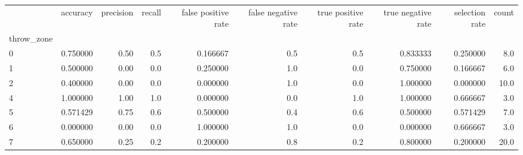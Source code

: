 \begin{tabular}{lrrrrrrrrr}
\toprule
{} &  accuracy &  precision &  recall &  false positive rate &  false negative rate &  true positive rate &  true negative rate &  selection rate &  count \\
throw\_zone &           &            &         &                      &                      &                     &                     &                 &        \\
\midrule
0          &  0.750000 &       0.50 &     0.5 &             0.166667 &                  0.5 &                 0.5 &            0.833333 &        0.250000 &    8.0 \\
1          &  0.500000 &       0.00 &     0.0 &             0.250000 &                  1.0 &                 0.0 &            0.750000 &        0.166667 &    6.0 \\
2          &  0.400000 &       0.00 &     0.0 &             0.000000 &                  1.0 &                 0.0 &            1.000000 &        0.000000 &   10.0 \\
4          &  1.000000 &       1.00 &     1.0 &             0.000000 &                  0.0 &                 1.0 &            1.000000 &        0.666667 &    3.0 \\
5          &  0.571429 &       0.75 &     0.6 &             0.500000 &                  0.4 &                 0.6 &            0.500000 &        0.571429 &    7.0 \\
6          &  0.000000 &       0.00 &     0.0 &             1.000000 &                  1.0 &                 0.0 &            0.000000 &        0.666667 &    3.0 \\
7          &  0.650000 &       0.25 &     0.2 &             0.200000 &                  0.8 &                 0.2 &            0.800000 &        0.200000 &   20.0 \\
\bottomrule
\end{tabular}
